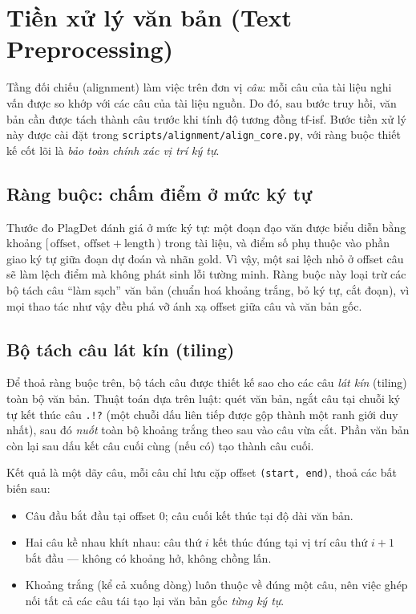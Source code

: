 
\section{Tiền xử lý văn bản (Text Preprocessing)}

Tầng đối chiếu (alignment) làm việc trên đơn vị \emph{câu}: mỗi câu của tài liệu nghi vấn được
so khớp với các câu của tài liệu nguồn. Do đó, sau bước truy hồi, văn bản cần được tách thành
câu trước khi tính độ tương đồng tf-isf. Bước tiền xử lý này được cài đặt trong
\texttt{scripts/alignment/align\_core.py}, với ràng buộc thiết kế cốt lõi là \emph{bảo toàn chính
xác vị trí ký tự}.

\subsection{Ràng buộc: chấm điểm ở mức ký tự}

Thước đo PlagDet đánh giá ở mức ký tự: một đoạn đạo văn được biểu diễn bằng khoảng
$[\,\mathrm{offset},\ \mathrm{offset}+\mathrm{length}\,)$ trong tài liệu, và điểm số phụ thuộc vào phần
giao ký tự giữa đoạn dự đoán và nhãn gold. Vì vậy, một sai lệch nhỏ ở offset câu sẽ làm lệch điểm
mà không phát sinh lỗi tường minh. Ràng buộc này loại trừ các bộ tách câu ``làm sạch'' văn bản
(chuẩn hoá khoảng trắng, bỏ ký tự, cắt đoạn), vì mọi thao tác như vậy đều phá vỡ ánh xạ offset
giữa câu và văn bản gốc.

\subsection{Bộ tách câu lát kín (tiling)}

Để thoả ràng buộc trên, bộ tách câu được thiết kế sao cho các câu \emph{lát kín} (tiling) toàn bộ
văn bản. Thuật toán dựa trên luật: quét văn bản, ngắt câu tại chuỗi ký tự kết thúc câu
\texttt{.!?} (một chuỗi dấu liên tiếp được gộp thành một ranh giới duy nhất), sau đó \emph{nuốt}
toàn bộ khoảng trắng theo sau vào câu vừa cắt. Phần văn bản còn lại sau dấu kết câu cuối cùng
(nếu có) tạo thành câu cuối.

Kết quả là một dãy câu, mỗi câu chỉ lưu cặp offset \texttt{(start, end)}, thoả các bất biến sau:

\begin{itemize}
  \item Câu đầu bắt đầu tại offset $0$; câu cuối kết thúc tại độ dài văn bản.
  \item Hai câu kề nhau khít nhau: câu thứ $i$ kết thúc đúng tại vị trí câu thứ $i{+}1$ bắt đầu
  --- không có khoảng hở, không chồng lấn.
  \item Khoảng trắng (kể cả xuống dòng) luôn thuộc về đúng một câu, nên việc ghép nối tất cả các
  câu tái tạo lại văn bản gốc \emph{từng ký tự}.
\end{itemize}

